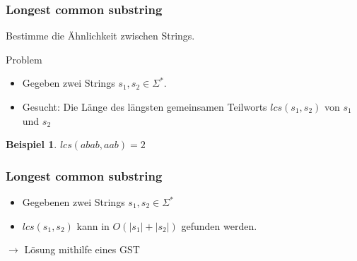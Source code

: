 \documentclass{beamer}
\newtheorem{exampleg}{Beispiel}
\newcommand{\abs}[1]{\left|#1\right|}
\begin{document}
\begin{frame}
\frametitle{Longest common substring}
Bestimme die Ähnlichkeit zwischen Strings.

\begin{block}{Problem}
\begin{itemize}
    \item Gegeben zwei Strings $s_1, s_2 \in \Sigma^*$.
    \item Gesucht: Die Länge des längsten gemeinsamen Teilworts $lcs(s_1, s_2)$ von $s_1$ und $s_2$
\end{itemize}
\end{block}
\begin{exampleg}
$lcs(abab, aab) = 2$
\end{exampleg}
\end{frame}

\begin{frame}
\frametitle{Longest common substring}
\begin{theorem}
\begin{itemize}
    \item Gegebenen zwei Strings $s_1, s_2 \in \Sigma^*$
    \item $lcs(s_1, s_2)$ kann in $O(\abs{s_1} + \abs{s_2})$ gefunden werden.
\end{itemize}
\end{theorem}
\vspace{5mm}
$\rightarrow$ Lösung mithilfe eines GST
\end{frame}
\end{document}
